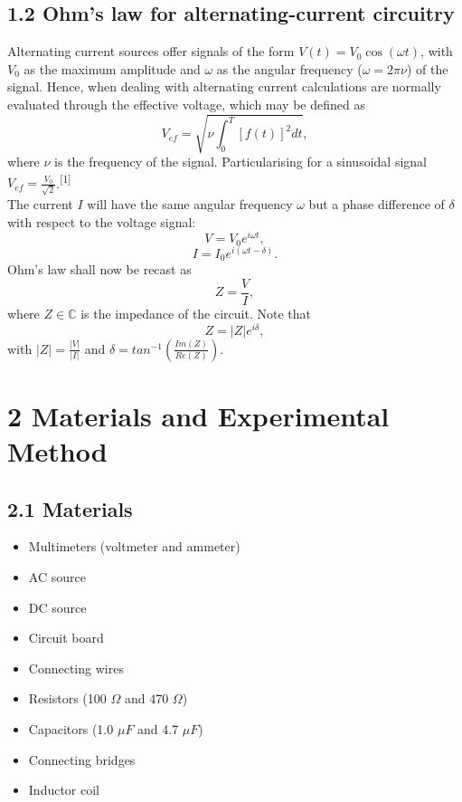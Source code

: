 \documentclass[a4paper, 12pt]{article}
\begin{document}
\subsection{1.2 Ohm's law for alternating-current circuitry}
Alternating current sources offer signals of the form $V(t) = V_0 \cos (\omega t)$, with $V_0$ as the maximum amplitude and $\omega$ as the angular frequency ($\omega = 2\pi\nu$) of the signal. Hence, when dealing with alternating current calculations are normally evaluated through the effective voltage, which may be defined as 
\begin{equation}\label{vef}
	V_{ef} = \sqrt{\nu \int_0^T [f(t)]^2 dt},
\end{equation}
where $\nu$ is the frequency of the signal. Particularising for a sinusoidal signal $V_{ef} = \frac{V_0}{\sqrt 2}$.\textsuperscript{[1]}\\

The current $I$ will have the same angular frequency $\omega$ but a phase difference of $\delta$ with respect to the voltage signal:
\begin{equation}\label{vi}
	V = V_0e^{i\omega t},
\end{equation}
\begin{equation}\label{ii}
	I = I_0e^{i(\omega t - \delta)}.
\end{equation}
Ohm's law shall now be recast as
\begin{equation}\label{ohm2}
	Z = \frac{V}{I},
\end{equation}
where $ Z \in \mathbb{C} $ is the impedance of the circuit. Note that
\begin{equation}\label{z}
	Z = |Z|e^{i\delta},
\end{equation}
with $|Z| = \frac{|V|}{|I|}$ and $\delta =  tan^{-1} \left(\frac{Im(Z)}{Re(Z)}\right)$.
\section{2 Materials and Experimental Method}
\subsection{2.1 Materials}
\begin{itemize}
	\item Multimeters (voltmeter and ammeter)
	\item AC source
	\item DC source
	\item Circuit board
	\item Connecting wires
	\item Resistors (100 $\Omega$ and 470 $\Omega$)
	\item Capacitors (1.0 $\mu F$ and  4.7 $\mu F$)
	\item Connecting bridges
	\item Inductor coil
\end{itemize}
\end{document}
